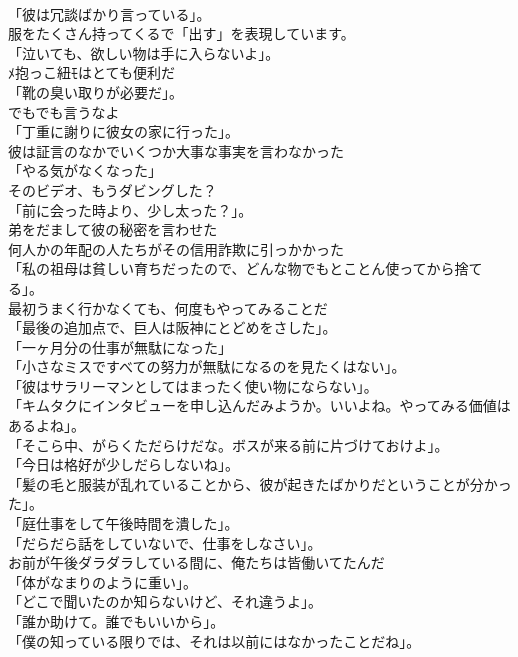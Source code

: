\documentclass[8pt]{extreport}
\begin{document}
\begin{CJK}{UTF8}{min}
\\	「彼は冗談ばかり言っている」。	
\\	服をたくさん持ってくるで「出す」を表現しています。	
\\	「泣いても、欲しい物は手に入らないよ」。	
\\	ﾒ抱っこ紐ﾓはとても便利だ	
\\	「靴の臭い取りが必要だ」。	
\\	でもでも言うなよ	
\\	「丁重に謝りに彼女の家に行った」。	
\\	彼は証言のなかでいくつか大事な事実を言わなかった	
\\	「やる気がなくなった」	
\\	そのビデオ、もうダビングした？	
\\	「前に会った時より、少し太った？」。	
\\	弟をだまして彼の秘密を言わせた	
\\	何人かの年配の人たちがその信用詐欺に引っかかった	
\\	「私の祖母は貧しい育ちだったので、どんな物でもとことん使ってから捨てる」。	
\\	最初うまく行かなくても、何度もやってみることだ	
\\	「最後の追加点で、巨人は阪神にとどめをさした」。	
\\	「一ヶ月分の仕事が無駄になった」	
\\	「小さなミスですべての努力が無駄になるのを見たくはない」。	
\\	「彼はサラリーマンとしてはまったく使い物にならない」。	
\\	「キムタクにインタビューを申し込んだみようか。いいよね。やってみる価値はあるよね」。	
\\	「そこら中、がらくただらけだな。ボスが来る前に片づけておけよ」。	
\\	「今日は格好が少しだらしないね」。	
\\	「髪の毛と服装が乱れていることから、彼が起きたばかりだということが分かった」。	
\\	「庭仕事をして午後時間を潰した」。	
\\	「だらだら話をしていないで、仕事をしなさい」。	
\\	お前が午後ダラダラしている間に、俺たちは皆働いてたんだ	
\\	「体がなまりのように重い」。	
\\	「どこで聞いたのか知らないけど、それ違うよ」。	
\\	「誰か助けて。誰でもいいから」。	
\\	「僕の知っている限りでは、それは以前にはなかったことだね」。	

\end{CJK}
\end{document}
